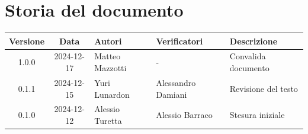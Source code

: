 \section*{Storia del documento}
\begin{tabularx}{\textwidth}{ c c p{2.75cm} p{3.1cm} X }
    \rowcolor{gray!20}\rule{0pt}{0.5cm}\textbf{Versione} & \textbf{Data} & \textbf{Autori} & \textbf{Verificatori} & \textbf{Descrizione} \\[0.7ex]
    \hline
    \rule{0pt}{0.5cm}1.0.0 & 2024-12-17 & Matteo Mazzotti & - & Convalida documento \\[0.7ex]
    \hline
    \rule{0pt}{0.5cm}0.1.1 & 2024-12-15 & Yuri Lunardon & Alessandro Damiani & Revisione del testo \\[0.7ex]
    \hline
    \rule{0pt}{0.5cm}0.1.0 & 2024-12-12 & Alessio Turetta & Alessio Barraco & Stesura iniziale \\[0.7ex]
\end{tabularx}
